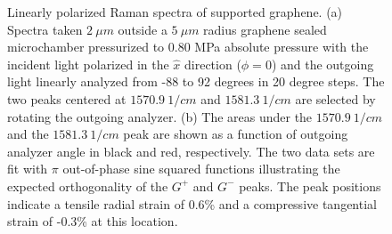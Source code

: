 \begin{figure}
\begin{center}
\end{center}
\caption{\label{qualout} Linearly polarized Raman spectra of supported graphene.  (a) Spectra taken $2 \ \mu m$ outside a $5 \ \mu m$ radius graphene sealed microchamber pressurized to 0.80 MPa absolute pressure with the incident light polarized in the $\hat x$ direction ($\phi=0$) and the outgoing light linearly analyzed from -88 to 92 degrees in 20 degree steps.  The two peaks centered at $1570.9 \ 1/cm$ and $1581.3 \ 1/cm$ are selected by rotating the outgoing analyzer.  (b) The areas under the $1570.9 \ 1/cm$ and the $1581.3 \ 1/cm$ peak are shown as a function of outgoing analyzer angle in black and red, respectively.  The two data sets are fit with $\pi$ out-of-phase sine squared functions illustrating the expected orthogonality of the $G^+$ and $G^-$ peaks\cite{Huang2009}. The peak positions indicate a tensile radial strain of 0.6\% and a compressive tangential strain of -0.3\% at this location.}
\end{figure}

